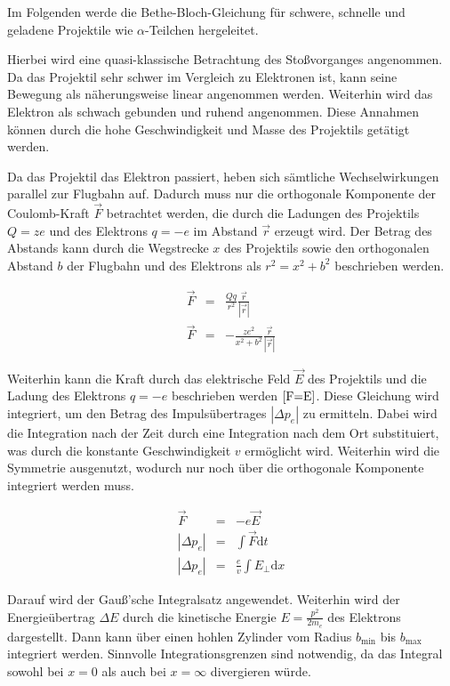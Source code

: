 \documentclass[12pt,a4paper]{scrartcl}
\numberwithin{equation}{section} %
\renewcommand{\[}{} %
\renewcommand{\]}{\noindent} %
\begin{document}
Im Folgenden werde die Bethe-Bloch-Gleichung für schwere, schnelle und
geladene Projektile wie \(\alpha\)-Teilchen hergeleitet.

Hierbei wird eine quasi-klassische Betrachtung des Stoßvorganges
angenommen. Da das Projektil sehr schwer im Vergleich zu Elektronen ist,
kann seine Bewegung als näherungsweise linear angenommen werden.
Weiterhin wird das Elektron als schwach gebunden und ruhend angenommen.
Diese Annahmen können durch die hohe Geschwindigkeit und Masse des
Projektils getätigt werden.

Da das Projektil das Elektron passiert, heben sich sämtliche
Wechselwirkungen parallel zur Flugbahn auf. Dadurch muss nur die
orthogonale Komponente der Coulomb-Kraft \(\vec F\) betrachtet werden,
die durch die Ladungen des Projektils \(Q=ze\) und des Elektrons
\(q=-e\) im Abstand \(\vec r\) erzeugt wird. Der Betrag des Abstands
kann durch die Wegstrecke \(x\) des Projektils sowie den orthogonalen
Abstand \(b\) der Flugbahn und des Elektrons als \(r^2=x^2+b^2\)
beschrieben werden.

\[
\begin{eqnarray}
    \vec F &=& \frac{Qq}{r^2} \frac{\vec{r}}{\left|\vec r\right|} \\
    \vec F &=& -\frac{ze^2}{x^2+b^2} \frac{\vec{r}}{\left|\vec r\right|}
\end{eqnarray}
\]

Weiterhin kann die Kraft durch das elektrische Feld \(\vec E\) des
Projektils und die Ladung des Elektrons \(q=-e\) beschrieben werden
\(\eqref{F=E}\). Diese Gleichung wird integriert, um den Betrag des
Impulsübertrages \(\left|\Delta p_e\right|\) zu ermitteln. Dabei wird
die Integration nach der Zeit durch eine Integration nach dem Ort
substituiert, was durch die konstante Geschwindigkeit \(v\) ermöglicht
wird. Weiterhin wird die Symmetrie ausgenutzt, wodurch nur noch über die
orthogonale Komponente integriert werden muss.

\[
\begin{eqnarray}
    \vec F &=& -e \vec E \label{F=E} \\
    \left|\Delta p_e\right| &=& \int \vec F \mathrm dt \\
    \left|\Delta p_e\right| &=& \frac{e}{v} \int E_\perp \mathrm dx
\end{eqnarray}
\]

Darauf wird der Gauß'sche Integralsatz angewendet. Weiterhin wird der
Energieübertrag \(\Delta E\) durch die kinetische Energie
\(E=\frac{p^2}{2m_e}\) des Elektrons dargestellt. Dann kann über einen
hohlen Zylinder vom Radius \(b_\mathrm{min}\) bis \(b_\mathrm{max}\)
integriert werden. Sinnvolle Integrationsgrenzen sind notwendig, da das
Integral sowohl bei \(x=0\) als auch bei \(x=\infty\) divergieren würde.
\end{document}
